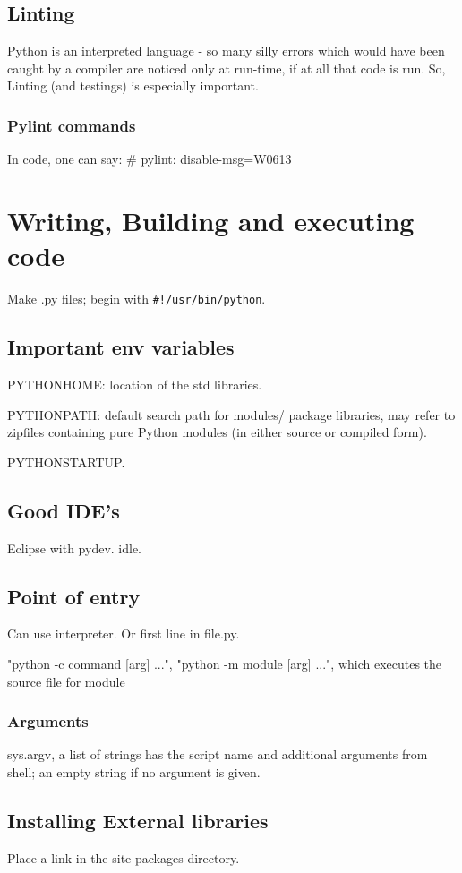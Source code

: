 \documentclass[oneside, article]{memoir}
\begin{document}
\subsection{Linting}
Python is an interpreted language - so many silly errors which would have been caught by a compiler are noticed only at run-time, if at all that code is run. So, Linting (and testings) is especially important.

\subsubsection{Pylint commands}
In code, one can say:
\# pylint: disable-msg=W0613

\section{Writing, Building and executing code}
Make .py files; begin with \verb'#!/usr/bin/python'.

\subsection{Important env variables}
PYTHONHOME: location of the std libraries.

PYTHONPATH: default search path for modules/ package libraries, may refer to zipfiles containing pure Python modules (in either source or compiled form).

PYTHONSTARTUP.

\subsection{Good IDE's}
Eclipse with pydev. idle.

\subsection{Point of entry}
Can use interpreter. Or first line in file.py.

"python -c command [arg] ...", "python -m module [arg] ...", which executes the source file for module

\subsubsection{Arguments}
sys.argv, a list of strings has the script name and additional arguments from shell; an empty string if no argument is given.

\subsection{Installing External libraries}
Place a link in the site-packages directory.
\end{document}
